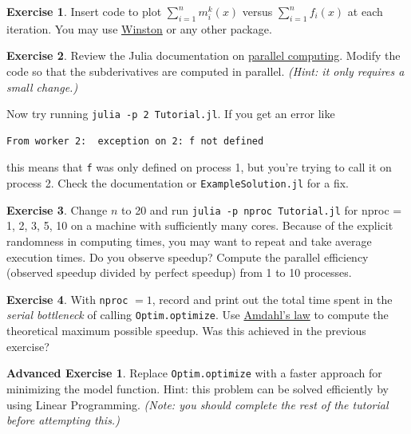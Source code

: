 \documentclass[12pt]{article}
\theoremstyle{definition}
\newtheorem*{advex}{Advanced Exercise}
\newtheorem{ex}{Exercise}
\begin{document}
\begin{ex}
Insert code to plot $\sum_{i=1}^n m_i^k(x)$ versus $\sum_{i=1}^n f_i(x)$ at each iteration. You may use \href{https://github.com/nolta/Winston.jl}{Winston} or any other package.
\end{ex}

\begin{ex}
Review the Julia documentation on \href{http://docs.julialang.org/en/latest/manual/parallel-computing/}{parallel computing}. Modify the code so that the subderivatives are computed in parallel. \textit{(Hint: it only requires a small change.)}
\end{ex}

Now try running \texttt{julia -p 2 Tutorial.jl}. If you get an error like
\begin{center}
\begin{BVerbatim}
From worker 2:	exception on 2: f not defined
\end{BVerbatim}
\end{center}
this means that \texttt{f} was only defined on process 1, but you're trying to call it on process 2. Check the documentation or \texttt{ExampleSolution.jl} for a fix.

\begin{ex}\label{ex:par}
Change $n$ to 20 and run \texttt{julia -p nproc Tutorial.jl} for nproc = 1, 2, 3, 5, 10 on a machine with sufficiently many cores. Because of the explicit randomness in computing times, you may want to repeat and take average execution times. Do you observe speedup? Compute the parallel efficiency (observed speedup divided by perfect speedup) from 1 to 10 processes. 
\end{ex}

\begin{ex}
With \texttt{nproc} $= 1$, record and print out the total time spent in the \textit{serial bottleneck} of calling \texttt{Optim.optimize}. Use \href{http://en.wikipedia.org/wiki/Amdahl's\_law}{Amdahl's law} to compute the theoretical maximum possible speedup. Was this achieved in the previous exercise?
\end{ex}

\begin{advex}
Replace \texttt{Optim.optimize} with a faster approach for minimizing the model function. Hint: this problem can be solved efficiently by using Linear Programming. \textit{(Note: you should complete the rest of the tutorial before attempting this.)}
\end{advex}
\end{document}
